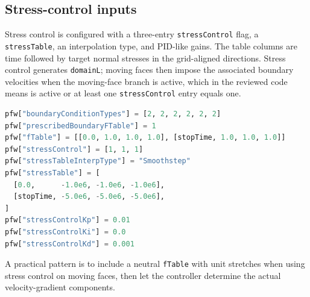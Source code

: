 \subsection{Stress-control inputs}

Stress control is configured with a three-entry \texttt{stressControl} flag, a \texttt{stressTable}, an interpolation type, and PID-like gains.  The table columns are time followed by target normal stresses in the grid-aligned directions.  Stress control generates \texttt{domainL}; moving faces then impose the associated boundary velocities when the moving-face branch is active, which in the reviewed code means  is active or at least one \texttt{stressControl} entry equals one.
\begin{lstlisting}[language=Python,caption={Stress-control input pattern.}]
pfw["boundaryConditionTypes"] = [2, 2, 2, 2, 2, 2]
pfw["prescribedBoundaryFTable"] = 1
pfw["fTable"] = [[0.0, 1.0, 1.0, 1.0], [stopTime, 1.0, 1.0, 1.0]]
pfw["stressControl"] = [1, 1, 1]
pfw["stressTableInterpType"] = "Smoothstep"
pfw["stressTable"] = [
  [0.0,      -1.0e6, -1.0e6, -1.0e6],
  [stopTime, -5.0e6, -5.0e6, -5.0e6],
]
pfw["stressControlKp"] = 0.01
pfw["stressControlKi"] = 0.0
pfw["stressControlKd"] = 0.001
\end{lstlisting}
A practical pattern is to include a neutral \texttt{fTable} with unit stretches when using stress control on moving faces, then let the controller determine the actual velocity-gradient components.
